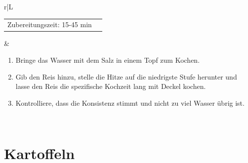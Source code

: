 \documentclass[a4paper, 12pt]{scrbook} 								%
\numberwithin{equation}{section} 									%
\begin{document}
\begin{tabularx}{\textwidth}{r|L}
\begin{tabular}[t]{rr}
			Zubereitungszeit: 15-45 min	\\
		\end{tabular}			&	\begin{enumerate}[nosep]
										\item Bringe das Wasser mit dem Salz in einem Topf zum Kochen.
										\item Gib den Reis hinzu, stelle die Hitze auf die niedrigste Stufe herunter und lasse den Reis die spezifische Kochzeit lang mit Deckel kochen.
										\item Kontrolliere, dass die Konsistenz stimmt und nicht zu viel Wasser übrig ist.
									\end{enumerate}	\\
	\end{tabularx}
	\newpage


	\section{Kartoffeln}
\end{document}
